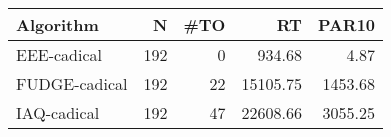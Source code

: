 \begin{tabular}{lrrrr}
\toprule
    Algorithm &   N &  \#TO &       RT &   PAR10 \\
\midrule
  EEE-cadical & 192 &    0 &   934.68 &    4.87 \\
FUDGE-cadical & 192 &   22 & 15105.75 & 1453.68 \\
  IAQ-cadical & 192 &   47 & 22608.66 & 3055.25 \\
\bottomrule
\end{tabular}
